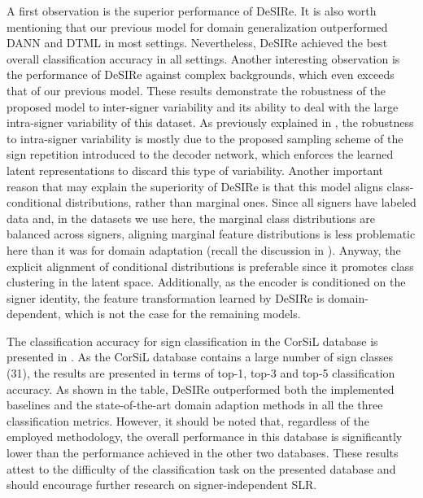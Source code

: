 A first observation is the superior performance of DeSIRe. It is also worth mentioning that our previous model for domain generalization outperformed DANN and DTML in most settings. Nevertheless, DeSIRe achieved the best overall classification accuracy in all settings. Another interesting observation is the performance of DeSIRe against complex backgrounds, which even exceeds that of our previous model. These results demonstrate the robustness of the proposed model to inter-signer variability and its ability to deal with the large intra-signer variability of this dataset. As previously explained in , the robustness to intra-signer variability is mostly due to the proposed sampling scheme of the sign repetition introduced to the decoder network, which enforces the learned latent representations to discard this type of variability. Another important reason that may explain the superiority of DeSIRe is that this model aligns class-conditional distributions, rather than marginal ones. Since all signers have labeled data and, in the datasets we use here, the marginal class distributions are balanced across signers, aligning marginal feature distributions is less problematic here than it was for domain adaptation (recall the discussion in ). Anyway, the explicit alignment of conditional distributions is preferable since it promotes class clustering in the latent space. Additionally, as the encoder is conditioned on the signer identity, the feature transformation learned by DeSIRe is domain-dependent, which is not the case for the remaining models.

The classification accuracy for sign classification in the CorSiL database is presented in . As the CorSiL database contains a large number of sign classes (31), the results are presented in terms of top-1, top-3 and top-5 classification accuracy. As shown in the table, DeSIRe outperformed both the implemented baselines and the state-of-the-art domain adaption methods in all the three classification metrics. However, it should be noted that, regardless of the employed methodology, the overall performance in this database is significantly lower than the performance achieved in the other two databases. These results attest to the difficulty of the classification task on the presented database and should encourage further research on signer-independent SLR.

